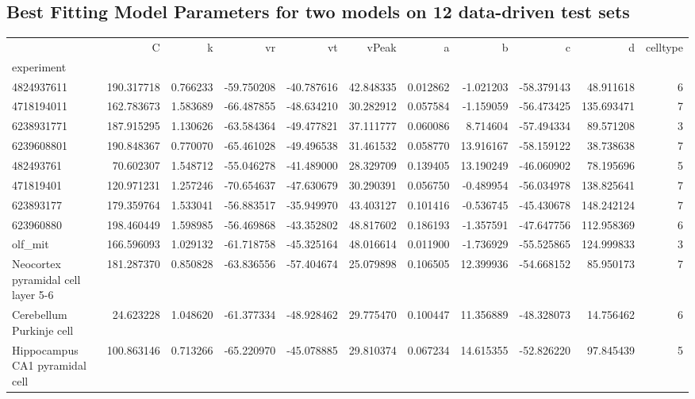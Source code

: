 \subsection{Best Fitting Model Parameters for two models on 12 data-driven test sets}\begin{tabular}{lrrrrrrrrrr}
\toprule
{} &           C &         k &         vr &         vt &      vPeak &         a &          b &          c &           d &  celltype \\
experiment                         &             &           &            &            &            &           &            &            &             &           \\
\midrule
4824937611                         &  190.317718 &  0.766233 & -59.750208 & -40.787616 &  42.848335 &  0.012862 &  -1.021203 & -58.379143 &   48.911618 &         6 \\
4718194011                         &  162.783673 &  1.583689 & -66.487855 & -48.634210 &  30.282912 &  0.057584 &  -1.159059 & -56.473425 &  135.693471 &         7 \\
6238931771                         &  187.915295 &  1.130626 & -63.584364 & -49.477821 &  37.111777 &  0.060086 &   8.714604 & -57.494334 &   89.571208 &         3 \\
6239608801                         &  190.848367 &  0.770070 & -65.461028 & -49.496538 &  31.461532 &  0.058770 &  13.916167 & -58.159122 &   38.738638 &         7 \\
482493761                          &   70.602307 &  1.548712 & -55.046278 & -41.489000 &  28.329709 &  0.139405 &  13.190249 & -46.060902 &   78.195696 &         5 \\
471819401                          &  120.971231 &  1.257246 & -70.654637 & -47.630679 &  30.290391 &  0.056750 &  -0.489954 & -56.034978 &  138.825641 &         7 \\
623893177                          &  179.359764 &  1.533041 & -56.883517 & -35.949970 &  43.403127 &  0.101416 &  -0.536745 & -45.430678 &  148.242124 &         7 \\
623960880                          &  198.460449 &  1.598985 & -56.469868 & -43.352802 &  48.817602 &  0.186193 &  -1.357591 & -47.647756 &  112.958369 &         6 \\
olf\_mit                            &  166.596093 &  1.029132 & -61.718758 & -45.325164 &  48.016614 &  0.011900 &  -1.736929 & -55.525865 &  124.999833 &         3 \\
Neocortex pyramidal cell layer 5-6 &  181.287370 &  0.850828 & -63.836556 & -57.404674 &  25.079898 &  0.106505 &  12.399936 & -54.668152 &   85.950173 &         7 \\
Cerebellum Purkinje cell           &   24.623228 &  1.048620 & -61.377334 & -48.928462 &  29.775470 &  0.100447 &  11.356889 & -48.328073 &   14.756462 &         6 \\
Hippocampus CA1 pyramidal cell     &  100.863146 &  0.713266 & -65.220970 & -45.078885 &  29.810374 &  0.067234 &  14.615355 & -52.826220 &   97.845439 &         5 \\
\bottomrule
\end{tabular}
